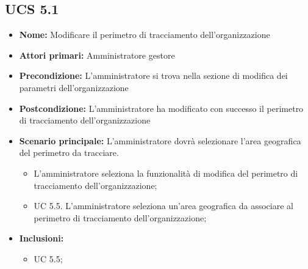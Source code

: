 \subsection{UCS 5.1}%
\begin{itemize}
    \item \textbf{Nome:} Modificare il perimetro di tracciamento dell'organizzazione
    \item \textbf{Attori primari:} Amministratore gestore
    \item \textbf{Precondizione:} L'amministratore si trova nella sezione di modifica dei parametri dell'organizzazione
    \item \textbf{Postcondizione:} L'amministratore ha modificato con successo il perimetro di tracciamento dell'organizzazione
    \item \textbf{Scenario principale:} L'amministratore dovrà selezionare l'area geografica del perimetro da tracciare.
    \begin{itemize}%
        \item L'amministratore seleziona la funzionalità di modifica del perimetro di tracciamento dell'organizzazione;
        \item UC 5.5. L'amministratore seleziona un'area geografica da associare al perimetro di tracciamento dell'organizzazione;
    \end{itemize} 
    \item \textbf{Inclusioni:}
    \begin{itemize}
        \item UC 5.5;
    \end{itemize}
\end{itemize}

